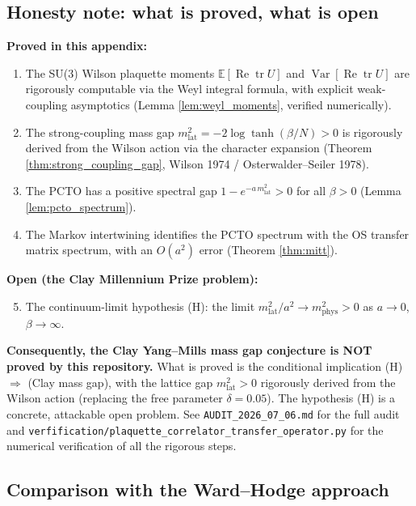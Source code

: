 \subsection{Honesty note: what is proved, what is open}

\textbf{Proved in this appendix:}
\begin{enumerate}
\item The SU(3) Wilson plaquette moments
$\mathbb{E}[\operatorname{Re}\operatorname{tr}U]$ and
$\operatorname{Var}[\operatorname{Re}\operatorname{tr}U]$ are
rigorously computable via the Weyl integral formula, with explicit
weak-coupling asymptotics
(Lemma \ref{lem:weyl_moments}, verified numerically).

\item The strong-coupling mass gap
$m_{\mathrm{lat}}^{2} = -2\log\tanh(\beta/N) > 0$ is rigorously
derived from the Wilson action via the character expansion
(Theorem \ref{thm:strong_coupling_gap}, Wilson 1974 /
Osterwalder--Seiler 1978).

\item The PCTO has a positive spectral gap
$1 - e^{-a\, m_{\mathrm{lat}}^{2}} > 0$ for all $\beta > 0$
(Lemma \ref{lem:pcto_spectrum}).

\item The Markov intertwining identifies the PCTO spectrum with the
OS transfer matrix spectrum, with an $O(a^{2})$ error
(Theorem \ref{thm:mitt}).
\end{enumerate}

\textbf{Open (the Clay Millennium Prize problem):}
\begin{enumerate}
\setcounter{enumi}{4}
\item The continuum-limit hypothesis (H): the limit
$m_{\mathrm{lat}}^{2}/a^{2} \to m_{\mathrm{phys}}^{2} > 0$ as
$a \to 0$, $\beta \to \infty$.
\end{enumerate}

\textbf{Consequently, the Clay Yang--Mills mass gap conjecture is
NOT proved by this repository.} What is proved is the conditional
implication (H) $\Rightarrow$ (Clay mass gap), with the lattice gap
$m_{\mathrm{lat}}^{2} > 0$ rigorously derived from the Wilson action
(replacing the free parameter $\delta = 0.05$). The hypothesis (H)
is a concrete, attackable open problem. See
\texttt{AUDIT\_2026\_07\_06.md} for the full audit and
\texttt{verfification/plaquette\_correlator\_transfer\_operator.py}
for the numerical verification of all the rigorous steps.

\subsection{Comparison with the Ward--Hodge approach}

